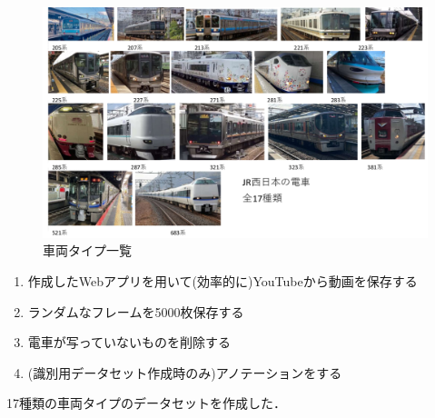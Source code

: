\usepackage{subcaption}
\usepackage{comment}



\maketitle %
\addtocounter{page}{1}
\thispagestyle{myfirstpage}

\begin{figure}
	\centering
	\includegraphics[width=0.6\linewidth]{fig/densya0202.png}
	\caption{車両タイプ一覧}
	\label{fig:densya0202}
\end{figure}





\begin{enumerate}
	\item 作成したWebアプリを用いて(効率的に)YouTubeから動画を保存する
	\item ランダムなフレームを5000枚保存する
	\item 電車が写っていないものを削除する
	\item  (識別用データセット作成時のみ)アノテーションをする
\end{enumerate}
17種類の車両タイプのデータセットを作成した．

